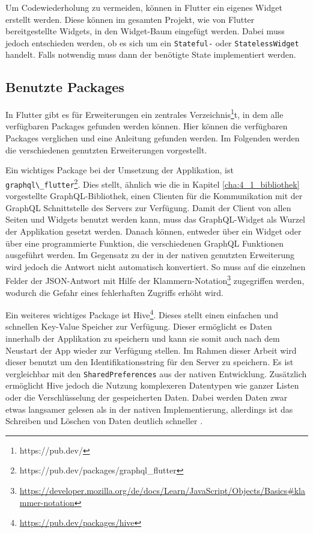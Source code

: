 Um Codewiederholung zu vermeiden, können in Flutter ein eigenes Widget erstellt werden. 
Diese können im gesamten Projekt, wie von Flutter bereitgestellte Widgets, in den Widget-Baum eingefügt werden. 
Dabei muss jedoch entschieden werden, ob es sich um ein \verb|Stateful-| oder \verb|StatelessWidget| handelt. Falls notwendig muss dann der benötigte State implementiert werden.


\subsection{Benutzte Packages}
\label{cha:4_3_2}
In Flutter gibt es für Erweiterungen ein zentrales Verzeichnis\footnote{https://pub.dev/}t, in dem alle verfügbaren Packages gefunden werden können. Hier können die verfügbaren Packages verglichen und eine Anleitung gefunden werden. Im Folgenden werden die verschiedenen genutzten Erweiterungen vorgestellt.

Ein wichtiges Package bei der Umsetzung der Applikation, ist \verb|graphql\_flutter|\footnote{https://pub.dev/packages/graphql\_flutter}. 
Dies stellt, ähnlich wie die in Kapitel \ref{cha:4_1_bibliothek} vorgestellte GraphQL-Bibliothek, einen Clienten für die Kommunikation mit der GraphQL Schnittstelle des Servers zur Verfügung.
Damit der Client von allen Seiten und Widgets benutzt werden kann, muss das GraphQL-Widget als Wurzel der Applikation gesetzt werden. Danach können, entweder über ein Widget oder über eine programmierte Funktion, die verschiedenen GraphQL Funktionen ausgeführt werden. 
Im Gegensatz zu der in der nativen genutzten Erweiterung wird jedoch die Antwort nicht automatisch konvertiert. So muss auf die einzelnen Felder der JSON-Antwort mit Hilfe der Klammern-Notation\footnote{\url{https://developer.mozilla.org/de/docs/Learn/JavaScript/Objects/Basics\#klammer-notation}} zugegriffen werden, wodurch die Gefahr eines fehlerhaften Zugriffs erhöht wird.

Ein weiteres wichtiges Package ist Hive\footnote{\url{https://pub.dev/packages/hive}}. Dieses stellt einen einfachen und schnellen Key-Value Speicher zur Verfügung. Dieser ermöglicht es Daten innerhalb der Applikation zu speichern und kann sie somit auch nach dem Neustart der App wieder zur Verfügung stellen. Im Rahmen dieser Arbeit wird dieser benutzt um den Identifikationsstring für den Server zu speichern. Es ist vergleichbar mit den \verb|SharedPreferences| aus der nativen Entwicklung. Zusätzlich ermöglicht Hive jedoch die Nutzung komplexeren Datentypen wie ganzer Listen oder die Verschlüsselung der gespeicherten Daten. Dabei werden Daten zwar etwas langsamer gelesen als in der nativen Implementierung, allerdings ist das Schreiben und Löschen von Daten deutlich schneller \cite{hive_vs_sharedPrefernces}.

